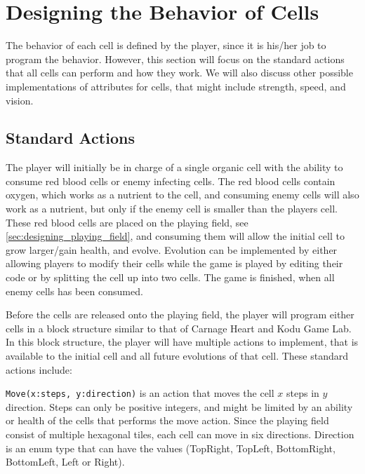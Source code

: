 \section{Designing the Behavior of Cells}

The behavior of each cell is defined by the player, since it is his/her job to program the behavior. However, this section will focus on the standard actions that all cells can perform and how they work. We will also discuss other possible implementations of attributes for cells, that might include strength, speed, and vision.

\subsection{Standard Actions}

The player will initially be in charge of a single organic cell with the ability to consume red blood cells or enemy infecting cells.
The red blood cells contain oxygen, which works as a nutrient to the cell, and consuming enemy cells will also work as a nutrient, but only if the enemy cell is smaller than the players cell.
These red blood cells are placed on the playing field, see \autoref{sec:designing_playing_field}, and consuming them will allow the initial cell to grow larger/gain health, and evolve.
Evolution can be implemented by either allowing players to modify their cells while the game is played by editing their code or by splitting the cell up into two cells.
The game is finished, when all enemy cells has been consumed.\newline

Before the cells are released onto the playing field, the player will program either cells in a block structure similar to that of Carnage Heart and Kodu Game Lab.
In this block structure, the player will have multiple actions to implement, that is available to the initial cell and all future evolutions of that cell.
These standard actions include:\newline

\verb|Move(x:steps, y:direction)| is an action that moves the cell $x$ steps in $y$ direction.
Steps can only be positive integers, and might be limited by an ability or health of the cells that performs the move action.
Since the playing field consist of multiple hexagonal tiles, each cell can move in six directions.
Direction is an enum type that can have the values (TopRight, TopLeft, BottomRight, BottomLeft, Left or Right).\newline

